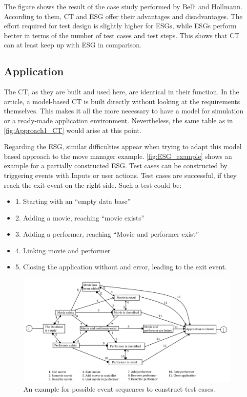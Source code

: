 The figure shows the result of the case study performed by Belli and Hollmann\cite{Belli}. According to them, CT and ESG offer their advantages and disadvantages. The effort required for test design is slightly higher for ESGs, while ESGs perform better in terms of the number of test cases and test steps. This shows that CT can at least keep up with ESG in comparison.

\subsection{Application}

The CT, as they are built and used here, are identical in their function. In the article, a model-based CT is built directly without looking at the requirements themselves. This makes it all the more necessary to have a model for simulation or a ready-made application environment. Nevertheless, the same table as in \autoref{fig:Approach1_CT} would arise at this point.

Regarding the ESG, similar difficulties appear when trying to adapt this model based approach to the move manager example. \autoref{fig:ESG_example} shows an example for a partially constructed ESG. Test cases can be constructed by triggering events with Inputs or user actions. Test cases are successful, if they reach the exit event on the right side. Such a test could be: 

\begin{itemize}
	\item 1. Starting with an \enquote{empty data base}
	\item 2. Adding a movie, reaching \enquote{movie exists}
	\item 3. Adding a performer, reaching \enquote{Movie and performer exist}
	\item 4. Linking movie and performer
	\item 5. Closing the application without and error, leading to the exit event.
\end{itemize}

\begin{figure}[H]
\centering
\includegraphics[scale=0.175]{../images/ESGamBeispiel2.png} 
\caption{An example for possible event sequences to construct test cases.}
\label{fig:ESG_example}
\end{figure}

